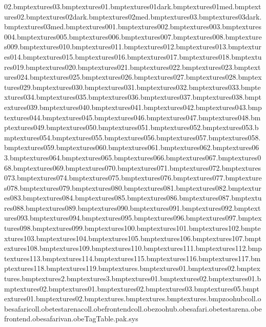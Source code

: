 02.bmp textures\testrok03.bmp textures\testrokgras01.bmp textures\testrokgras01dark.bmp textures\testrokgras01med.bmp textures\testrokgras02.bmp textures\testrokgras02dark.bmp textures\testrokgras02med.bmp textures\testrokgras03.bmp textures\testrokgras03dark.bmp textures\testrokgras03med.bmp textures\tstbg001.bmp textures\tstbg002.bmp textures\tstbg003.bmp textures\tstbg004.bmp textures\tstbg005.bmp textures\tstbg006.bmp textures\tstbg007.bmp textures\tstbg008.bmp textures\tstbg009.bmp textures\tstbg010.bmp textures\tstbg011.bmp textures\tstbg012.bmp textures\tstbg013.bmp textures\tstbg014.bmp textures\tstbg015.bmp textures\tstbg016.bmp textures\tstbg017.bmp textures\tstbg018.bmp textures\tstbg019.bmp textures\tstbg020.bmp textures\tstbg021.bmp textures\tstbg022.bmp textures\tstbg023.bmp textures\tstbg024.bmp textures\tstbg025.bmp textures\tstbg026.bmp textures\tstbg027.bmp textures\tstbg028.bmp textures\tstbg029.bmp textures\tstbg030.bmp textures\tstbg031.bmp textures\tstbg032.bmp textures\tstbg033.bmp textures\tstbg034.bmp textures\tstbg035.bmp textures\tstbg036.bmp textures\tstbg037.bmp textures\tstbg038.bmp textures\tstbg039.bmp textures\tstbg040.bmp textures\tstbg041.bmp textures\tstbg042.bmp textures\tstbg043.bmp textures\tstbg044.bmp textures\tstbg045.bmp textures\tstbg046.bmp textures\tstbg047.bmp textures\tstbg048.bmp textures\tstbg049.bmp textures\tstbg050.bmp textures\tstbg051.bmp textures\tstbg052.bmp textures\tstbg053.bmp textures\tstbg054.bmp textures\tstbg055.bmp textures\tstbg056.bmp textures\tstbg057.bmp textures\tstbg058.bmp textures\tstbg059.bmp textures\tstbg060.bmp textures\tstbg061.bmp textures\tstbg062.bmp textures\tstbg063.bmp textures\tstbg064.bmp textures\tstbg065.bmp textures\tstbg066.bmp textures\tstbg067.bmp textures\tstbg068.bmp textures\tstbg069.bmp textures\tstbg070.bmp textures\tstbg071.bmp textures\tstbg072.bmp textures\tstbg073.bmp textures\tstbg074.bmp textures\tstbg075.bmp textures\tstbg076.bmp textures\tstbg077.bmp textures\tstbg078.bmp textures\tstbg079.bmp textures\tstbg080.bmp textures\tstbg081.bmp textures\tstbg082.bmp textures\tstbg083.bmp textures\tstbg084.bmp textures\tstbg085.bmp textures\tstbg086.bmp textures\tstbg087.bmp textures\tstbg088.bmp textures\tstbg089.bmp textures\tstbg090.bmp textures\tstbg091.bmp textures\tstbg092.bmp textures\tstbg093.bmp textures\tstbg094.bmp textures\tstbg095.bmp textures\tstbg096.bmp textures\tstbg097.bmp textures\tstbg098.bmp textures\tstbg099.bmp textures\tstbg100.bmp textures\tstbg101.bmp textures\tstbg102.bmp textures\tstbg103.bmp textures\tstbg104.bmp textures\tstbg105.bmp textures\tstbg106.bmp textures\tstbg107.bmp textures\tstbg108.bmp textures\tstbg109.bmp textures\tstbg110.bmp textures\tstbg111.bmp textures\tstbg112.bmp textures\tstbg113.bmp textures\tstbg114.bmp textures\tstbg115.bmp textures\tstbg116.bmp textures\tstbg117.bmp textures\tstbg118.bmp textures\tstbg119.bmp textures\jhut.bmp textures\jhutboard01.bmp textures\jhutboard02.bmp textures\jhutbrik.bmp textures\jhutbrik2.bmp textures\jhutbrik3.bmp textures\jhutdoor01.bmp textures\jhutdoor02.bmp textures\jhuthatch01.bmp textures\jhuthatch02.bmp textures\jhutwin01.bmp textures\jhutwin02.bmp textures\jhutwin03.bmp textures\jhutwin05.bmp textures\taztop01.bmp textures\taztop02.bmp textures\transparent.bmp textures\wanted.bmp textures\wantedwood.bmp zoohubcoll.obe safaricoll.obe testarenacoll.obe frontendcoll.obe zoohub.obe safari.obe testarena.obe frontend.obe safarivan.obe TagTable.pak.sys 